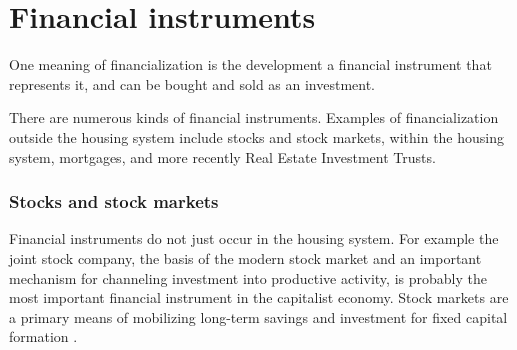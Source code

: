 \section{Financial instruments} \label{section-financial-instruments}
One meaning of financialization is the development  
a \gls{financial instrument} that represents it, and can be bought and sold as an investment.

There are numerous kinds of financial instruments. Examples of financialization outside the housing system include stocks and stock markets, within the housing system, mortgages, and more recently Real Estate Investment Trusts.

\subsubsection{Stocks and stock markets}
Financial instruments do not just occur in the housing system. 
For example the \gls{joint stock company}, the basis of the modern stock market and an important mechanism for channeling investment into productive activity,  is probably the most important financial instrument in the capitalist economy.  Stock markets are %
a primary means of %
mobilizing long-term savings and investment for fixed capital formation \cite{azfarMarketMobilizedCapital2003}.  

